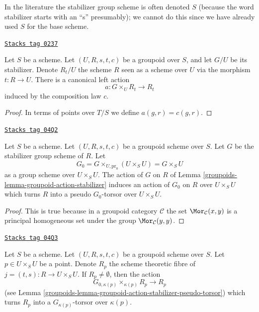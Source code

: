 In the literature the stabilizer group scheme is often denoted $S$
(because the word stabilizer starts with an ``s'' presumably);
we cannot do this since we have already used $S$ for the base scheme.

\begin{lemma}
\label{groupoids-lemma-groupoid-action-stabilizer}
\href{https://stacks.math.columbia.edu/tag/0237}{\texttt{Stacks tag 0237}}

Let $S$ be a scheme.
Let $(U, R, s, t, c)$ be a groupoid over $S$, and let $G/U$ be its stabilizer.
Denote $R_t/U$ the scheme $R$ seen as a scheme over $U$ via the
morphism $t : R \to U$.
There is a canonical left action
$$
a : G \times_U R_t \longrightarrow R_t
$$
induced by the composition law $c$.
\end{lemma}

\begin{proof}
In terms of points over $T/S$ we define $a(g, r) = c(g, r)$.
\end{proof}

\begin{lemma}
\label{groupoids-lemma-groupoid-action-stabilizer-pseudo-torsor}
\href{https://stacks.math.columbia.edu/tag/04Q2}{\texttt{Stacks tag 04Q2}}

Let $S$ be a scheme. Let $(U, R, s, t, c)$ be a groupoid scheme
over $S$. Let $G$ be the stabilizer group scheme of $R$.
Let
$$
G_0 = G \times_{U, \text{pr}_0} (U \times_S U) = G \times_S U
$$
as a group scheme over $U \times_S U$. The action of $G$ on $R$ of
Lemma \ref{groupoids-lemma-groupoid-action-stabilizer}
induces an action of $G_0$ on $R$ over $U \times_S U$
which turns $R$ into a pseudo $G_0$-torsor over $U \times_S U$.
\end{lemma}

\begin{proof}
This is true because in a groupoid category $\mathcal{C}$ the set
$\Mor_\mathcal{C}(x, y)$ is a principal homogeneous set
under the group $\Mor_\mathcal{C}(y, y)$.
\end{proof}

\begin{lemma}[Fibres j]
\label{groupoids-lemma-fibres-j}
\href{https://stacks.math.columbia.edu/tag/04Q3}{\texttt{Stacks tag 04Q3}}

Let $S$ be a scheme. Let $(U, R, s, t, c)$ be a groupoid scheme over $S$.
Let $p \in U \times_S U$ be a point. Denote
$R_p$ the scheme theoretic fibre of $j = (t, s) : R \to U \times_S U$.
If $R_p \not = \emptyset$, then the action
$$
G_{0, \kappa(p)} \times_{\kappa(p)} R_p \longrightarrow R_p
$$
(see
Lemma \ref{groupoids-lemma-groupoid-action-stabilizer-pseudo-torsor})
which turns $R_p$ into a $G_{\kappa(p)}$-torsor over $\kappa(p)$.
\end{lemma}

